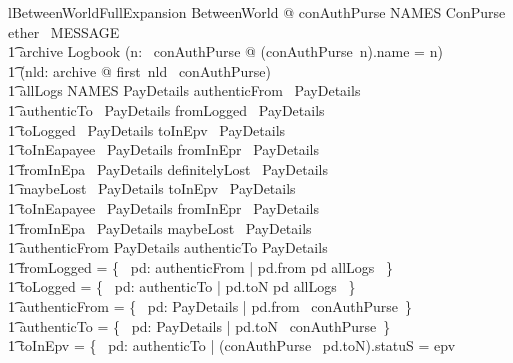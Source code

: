 \begin{LNewLemma}
\begin{theorem}{lBetweenWorldFullExpansion}
    \forall BetweenWorld @ conAuthPurse \in NAMES \finj ConPurse \land
            ether \in \power~MESSAGE \land \\ \t1
            archive \in Logbook \land  (\forall n: \dom~conAuthPurse @ (conAuthPurse~n).name = n) \land \\ \t1
            (\forall nld: archive @ first~nld \in \dom~conAuthPurse) \land \\
        \t1
            allLogs \in NAMES \rel PayDetails \land
            authenticFrom \in \power~PayDetails \land \\ \t1
            authenticTo \in \power~PayDetails \land
            fromLogged \in \power~PayDetails \land \\ \t1
            toLogged \in \power~PayDetails \land
            toInEpv \in \power~PayDetails \land \\ \t1
            toInEapayee \in \power~PayDetails \land
            fromInEpr \in \power~PayDetails \land \\ \t1
            fromInEpa \in \power~PayDetails \land
            definitelyLost \in \power~PayDetails \land \\ \t1
            maybeLost \in \power~PayDetails \land
            toInEpv \in \finset~PayDetails \land \\ \t1
            toInEapayee \in \finset~PayDetails \land
            fromInEpr \in \finset~PayDetails \land \\ \t1
            fromInEpa \in \finset~PayDetails \land
            maybeLost \in \finset~PayDetails \land \\ \t1
            authenticFrom \in \finset PayDetails \land
            authenticTo \in \finset PayDetails \land \\ \t1
            fromLogged = \{~ pd: authenticFrom | pd.from \mapsto pd \in allLogs ~\} \land \\ \t1
            toLogged = \{~ pd: authenticTo | pd.toN \mapsto pd \in allLogs ~\} \land \\ \t1
            authenticFrom = \{~ pd: PayDetails | pd.from \in \dom~conAuthPurse~\} \land \\ \t1
            authenticTo = \{~ pd: PayDetails | pd.toN \in \dom~conAuthPurse~\} \land \\ \t1
            toInEpv = \{~ pd: authenticTo | (conAuthPurse~ pd.toN).statuS = epv \\

\end{theorem}
\end{LNewLemma}
